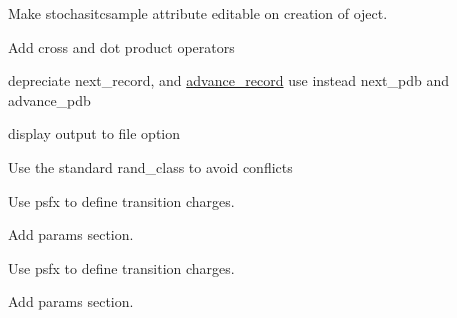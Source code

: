 
\begin{DoxyRefList}
\item[\label{todo__todo000001}%
\Hypertarget{todo__todo000001}%
Module \hyperlink{namespaceharmonicbath__class}{harmonicbath\+\_\+class} ]Make stochasitcsample attribute editable on creation of oject.  
\item[\label{todo__todo000008}%
\Hypertarget{todo__todo000008}%
Module \hyperlink{namespacemath}{math} ]
\begin{DoxyItemize}
\item Add cross and dot product operators  
\end{DoxyItemize}
\item[\label{todo__todo000002}%
\Hypertarget{todo__todo000002}%
Module \hyperlink{namespacemolreader}{molreader} ]depreciate next\+\_\+record, and \hyperlink{interfacemolreader_1_1advance__record}{advance\+\_\+record} use instead next\+\_\+pdb and advance\+\_\+pdb  
\item[\label{todo__todo000003}%
\Hypertarget{todo__todo000003}%
Module \hyperlink{namespacepldm__class}{pldm\+\_\+class} ]
\begin{DoxyItemize}
\item display output to file option  
\end{DoxyItemize}
\item[\label{todo__todo000004}%
\Hypertarget{todo__todo000004}%
Subprogram \hyperlink{praxis_8f_af54b43bfee4d4da9d35c12de385dd6cd}{ran0} (idum)]Use the standard rand\+\_\+class to avoid conflicts  
\item[\label{todo__todo000006}%
\Hypertarget{todo__todo000006}%
Subprogram \hyperlink{namespacespectrometer__class_af1fc802879075c7e5e42ef4baac69445}{spectrometer\+\_\+class\+:\+:get\+\_\+abpdbspectrum} (this, qs, file, pdb, psf, psfx, atm\+\_\+select, dipole\+\_\+to, dipole\+\_\+from, dipole\+\_\+center)]
\begin{DoxyItemize}
\item Use psfx to define transition charges.
\item Add params section. 
\end{DoxyItemize}


\begin{DoxyItemize}
\item Use psfx to define transition charges.
\item Add params section. 
\end{DoxyItemize}



\end{DoxyRefList}
